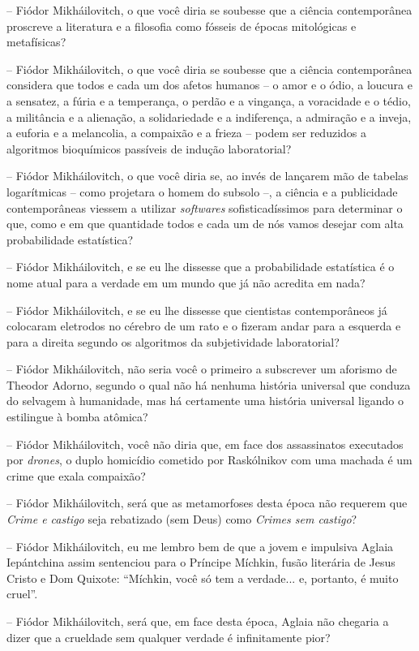 -- Fiódor Mikháilovitch, o que você diria se soubesse que a ciência
contemporânea proscreve a literatura e a filosofia como fósseis de
épocas mitológicas e metafísicas?

-- Fiódor Mikháilovitch, o que você diria se soubesse que a ciência
contemporânea considera que todos e cada um dos afetos humanos -- o amor
e o ódio, a loucura e a sensatez, a fúria e a temperança, o perdão e a
vingança, a voracidade e o tédio, a militância e a alienação, a
solidariedade e a indiferença, a admiração e a inveja, a euforia e a
melancolia, a compaixão e a frieza -- podem ser reduzidos a algoritmos
bioquímicos passíveis de indução laboratorial?

-- Fiódor Mikháilovitch, o que você diria se, ao invés de lançarem mão
de tabelas logarítmicas -- como projetara o homem do subsolo --, a
ciência e a publicidade contemporâneas viessem a utilizar
\emph{softwares} sofisticadíssimos para determinar o que, como e em que
quantidade todos e cada um de nós vamos desejar com alta probabilidade
estatística?

-- Fiódor Mikháilovitch, e se eu lhe dissesse que a probabilidade
estatística é o nome atual para a verdade em um mundo que já não
acredita em nada?

-- Fiódor Mikháilovitch, e se eu lhe dissesse que cientistas
contemporâneos já colocaram eletrodos no cérebro de um rato e o fizeram
andar para a esquerda e para a direita segundo os algoritmos da
subjetividade laboratorial?

-- Fiódor Mikháilovitch, não seria você o primeiro a subscrever um
aforismo de Theodor Adorno, segundo o qual não há nenhuma história
universal que conduza do selvagem à humanidade, mas há certamente uma
história universal ligando o estilingue à bomba atômica?

-- Fiódor Mikháilovitch, você não diria que, em face dos assassinatos
executados por \emph{drones}, o duplo homicídio cometido por Raskólnikov
com uma machada é um crime que exala compaixão?

-- Fiódor Mikháilovitch, será que as metamorfoses desta época não
requerem que \emph{Crime e castigo} seja rebatizado (sem Deus) como
\emph{Crimes sem castigo}?

-- Fiódor Mikháilovitch, eu me lembro bem de que a jovem e impulsiva
Aglaia Iepántchina assim sentenciou para o Príncipe Míchkin, fusão
literária de Jesus Cristo e Dom Quixote: ``Míchkin, você só tem a
verdade... e, portanto, é muito cruel''.

-- Fiódor Mikháilovitch, será que, em face desta época, Aglaia não
chegaria a dizer que a crueldade sem qualquer verdade é infinitamente
pior?

